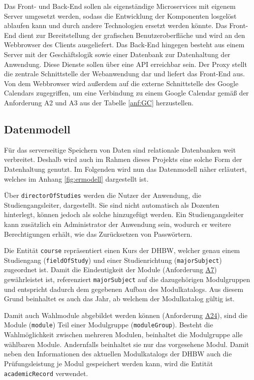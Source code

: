 Das Front- und Back-End sollen als eigenständige Microservices mit eigenem Server umgesetzt werden, sodass die Entwicklung der Komponenten losgelöst ablaufen kann und durch andere Technologien ersetzt werden könnte.
Das Front-End dient zur Bereitstellung der grafischen Benutzeroberfläche und wird an den Webbrowser des Clients ausgeliefert. 
Das Back-End hingegen besteht aus einem Server mit der Geschäftslogik sowie einer Datenbank zur Datenhaltung der Anwendung. 
Diese Dienste sollen über eine \ac{API} erreichbar sein. 
Der Proxy stellt die zentrale Schnittstelle der Webanwendung dar und liefert das Front-End aus. 
Von dem Webbrowser wird außerdem auf die externe Schnittstelle des Google Calendars zugegriffen, um eine Verbindung zu einem Google Calendar gemäß der Anforderung A2 und A3 aus der Tabelle \vref{anf:GC} herzustellen.


\subsection{Datenmodell}
Für das serverseitige Speichern von Daten sind relationale Datenbanken weit verbreitet.
Deshalb wird auch im Rahmen dieses Projekts eine solche Form der Datenhaltung genutzt.
Im Folgenden wird nun das Datenmodell näher erläutert, welches im Anhang \vref{fig:ermodell} dargestellt ist.  

Über \texttt{directorOfStudies} werden die Nutzer der Anwendung, die Studiengangsleiter, dargestellt.
Sie sind nicht automatisch als Dozenten hinterlegt, können jedoch als solche hinzugefügt werden.
Ein Studiengangsleiter kann zusätzlich ein Administrator der Anwendung sein, wodurch er weitere Berechtigungen erhält, wie das Zurücksetzen von Passwörtern.

Die Entität \texttt{course} repräsentiert einen Kurs der \ac{DHBW}, welcher genau einem Studiengang (\texttt{fieldOfStudy}) und einer Studienrichtung (\texttt{majorSubject}) zugeordnet ist.
Damit die Eindeutigkeit der Module (Anforderung \hyperref[tab:Anforderungen]{A7}) gewährleistet ist, referenziert \texttt{majorSubject} auf die dazugehörigen Modulgruppen und entspricht dadurch dem gegebenen Aufbau des Modulkatalogs.
Aus diesem Grund beinhaltet es auch das Jahr, ab welchem der Modulkatalog gültig ist. 

Damit auch Wahlmodule abgebildet werden können (Anforderung \hyperref[tab:Anforderungen]{A24}), sind die Module (\texttt{module}) Teil einer Modulgruppe (\texttt{moduleGroup}).
Besteht die Wahlmöglichkeit zwischen mehreren Modulen, beinhaltet die Modulgruppe alle wählbaren Module.
Andernfalls beinhaltet sie nur das vorgesehene Modul.
Damit neben den Informationen des aktuellen Modulkatalogs der \ac{DHBW} auch die Prüfungsleistung je Modul gespeichert werden kann, wird die Entität \texttt{academicRecord} verwendet.

